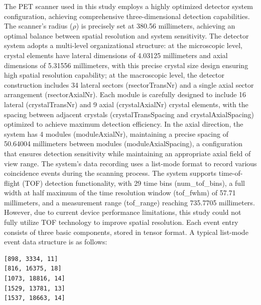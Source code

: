 \documentclass[
reprint,
superscriptaddress,
nofootinbib,
amsmath,amssymb,
aps,
prd,
]{revtex4-2}
\begin{document}
The PET scanner used in this study employs a highly optimized detector system configuration, achieving comprehensive three-dimensional detection capabilities. The scanner's radius ($\rho$) is precisely set at 380.56 millimeters, achieving an optimal balance between spatial resolution and system sensitivity. The detector system adopts a multi-level organizational structure: at the microscopic level, crystal elements have lateral dimensions of 4.03125 millimeters and axial dimensions of 5.31556 millimeters, with this precise crystal size design ensuring high spatial resolution capability; at the macroscopic level, the detector construction includes 34 lateral sectors (rsectorTransNr) and a single axial sector arrangement (rsectorAxialNr). Each module is carefully designed to include 16 lateral (crystalTransNr) and 9 axial (crystalAxialNr) crystal elements, with the spacing between adjacent crystals (crystalTransSpacing and crystalAxialSpacing) optimized to achieve maximum detection efficiency. In the axial direction, the system has 4 modules (moduleAxialNr), maintaining a precise spacing of 50.64004 millimeters between modules (moduleAxialSpacing), a configuration that ensures detection sensitivity while maintaining an appropriate axial field of view range.
The system's data recording uses a list-mode format to record various coincidence events during the scanning process. The system supports time-of-flight (TOF) detection functionality, with 29 time bins (num\_tof\_bins), a full width at half maximum of the time resolution window (tof\_fwhm) of 57.71 millimeters, and a measurement range (tof\_range) reaching 735.7705 millimeters. However, due to current device performance limitations, this study could not fully utilize TOF technology to improve spatial resolution. Each event entry consists of three basic components, stored in tensor format. A typical list-mode event data structure is as follows:

\begin{verbatim}
[898, 3334, 11]
[816, 16375, 18]
[1073, 18816, 14]
[1529, 13781, 13]
[1537, 18663, 14]
\end{verbatim}
\end{document}
